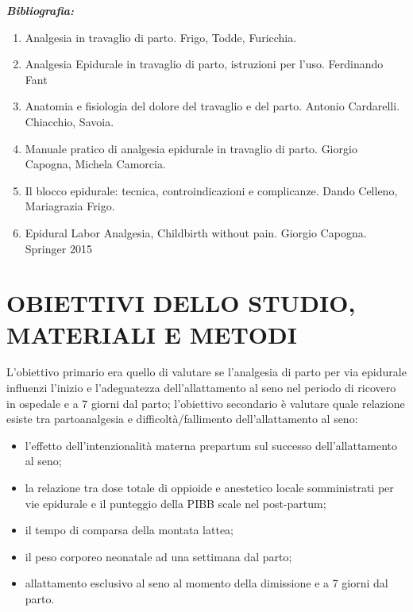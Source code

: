 \documentclass[]{article}
\begin{document}
\emph{\textbf{Bibliografia:}}

\begin{enumerate}
\def\labelenumi{\arabic{enumi}.}
\item
  Analgesia in travaglio di parto. Frigo, Todde, Furicchia.
\item
  Analgesia Epidurale in travaglio di parto, istruzioni per l'uso.
  Ferdinando Fant
\item
  Anatomia e fisiologia del dolore del travaglio e del parto. Antonio
  Cardarelli. Chiacchio, Savoia.
\item
  Manuale pratico di analgesia epidurale in travaglio di parto. Giorgio
  Capogna, Michela Camorcia.
\item
  Il blocco epidurale: tecnica, controindicazioni e complicanze. Dando
  Celleno, Mariagrazia Frigo.
\item
  Epidural Labor Analgesia, Childbirth without pain. Giorgio Capogna.
  Springer 2015
\end{enumerate}

\hypertarget{obiettivi-dello-studio-materiali-e-metodi}{%
\section{OBIETTIVI DELLO STUDIO, MATERIALI E
METODI}\label{obiettivi-dello-studio-materiali-e-metodi}}

L'{obiettivo primario} era quello di valutare se l'analgesia di parto
per via epidurale influenzi l'inizio e l'adeguatezza dell'allattamento
al seno nel periodo di ricovero in ospedale e a 7 giorni dal parto;
l'{obiettivo secondario} è valutare quale relazione esiste tra
partoanalgesia e difficoltà/fallimento dell'allattamento al seno:

\begin{itemize}
\item
  l'effetto dell'intenzionalità materna prepartum sul successo
  dell'allattamento al seno;
\item
  la relazione tra dose totale di oppioide e anestetico locale
  somministrati per vie epidurale e il punteggio della PIBB scale nel
  post-partum;
\item
  il tempo di comparsa della montata lattea;
\item
  il peso corporeo neonatale ad una settimana dal parto;
\item
  allattamento esclusivo al seno al momento della dimissione e a 7
  giorni dal parto.
\end{itemize}
\end{document}
